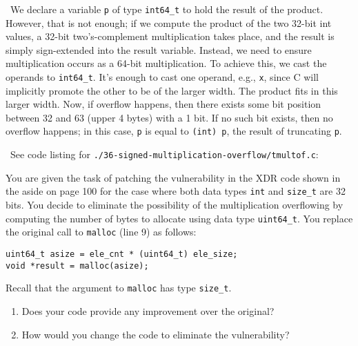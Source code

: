 \documentclass[12pt]{article}
\newenvironment{ex}[2][Exercise]{\begin{trivlist}
		\item[\hskip \labelsep {\bfseries #1}\hskip \labelsep {\bfseries #2.}]}{\end{trivlist}}
\newenvironment{sol}[1][Solution]{\begin{trivlist}
		\item[\hskip \labelsep {\bfseries #1:}]}{\end{trivlist}}
\begin{document}
\begin{sol}
	\
	We declare a variable \texttt{p} of type \texttt{int64\_t} to hold
	the result of the product. However, that is not enough; if we compute
	the product of the two 32-bit int values, a 32-bit two's-complement
	multiplication takes place, and the result is simply sign-extended
	into the result variable. Instead, we need to ensure multiplication
	occurs as a 64-bit multiplication. To achieve this, we cast the operands
	to \texttt{int64\_t}. It's enough to cast one operand, e.g., \texttt{x},
	since C will implicitly promote the other to be of the larger
	width. The product fits in this larger width. Now, if overflow happens,
	then there exists some bit position between 32 and 63 (upper 4 bytes) with a 1 bit. 
	If no such bit exists, then no overflow happens; in this case, \texttt{p} is
	equal to \texttt{(int) p}, the result of truncating \texttt{p}.
	
	\
	See code listing for \texttt{./36-signed-multiplication-overflow/tmultof.c}:
	
\end{sol}

\begin{ex}{2.37}
	You are given the task of patching the vulnerability in the XDR code
	shown in the aside on page 100 for the case where both data types
	\texttt{int} and \texttt{size\_t} are 32 bits. You decide to eliminate
	the possibility of the multiplication overflowing by computing the
	number of bytes to allocate using data type \texttt{uint64\_t}.
	You replace the original call to \texttt{malloc} (line 9) as follows:
	\begin{lstlisting}
uint64_t asize = ele_cnt * (uint64_t) ele_size;
void *result = malloc(asize);
	\end{lstlisting}
	Recall that the argument to \texttt{malloc} has type \texttt{size\_t}.
	\begin{enumerate}
		\item Does your code provide any improvement over the original?
		\item How would you change the code to eliminate the
		vulnerability?
	\end{enumerate}
\end{ex}
\end{document}
